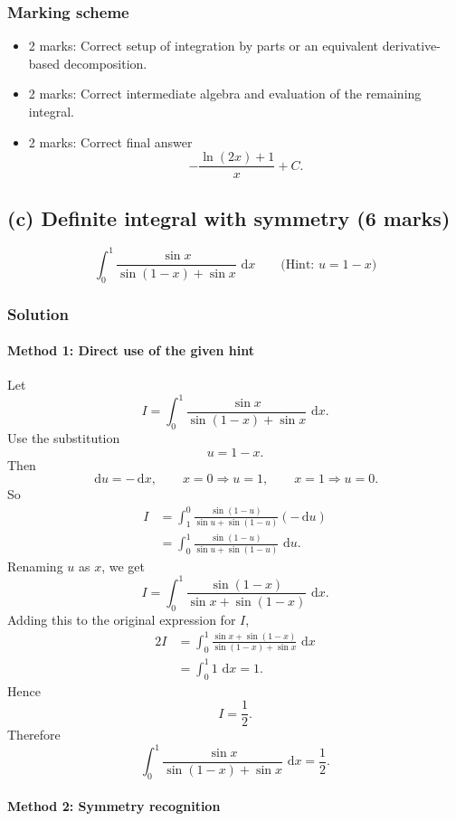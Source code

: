 \documentclass[12pt]{article}
\newcommand{\dd}{\,\mathrm{d}}
\begin{document}
\bigskip
\subsubsection{Marking scheme}
\begin{itemize}
\item 2 marks: Correct setup of integration by parts or an equivalent derivative-based decomposition.
\item 2 marks: Correct intermediate algebra and evaluation of the remaining integral.
\item 2 marks: Correct final answer
\[
-\frac{\ln(2x)+1}{x}+C.
\]
\end{itemize}
\bigskip
\subsection{(c) Definite integral with symmetry \hfill (6 marks)}

\[
\int_0^1 \frac{\sin x}{\sin(1-x)+\sin x}\,\dd x
\qquad
\text{(Hint: }u=1-x\text{)}
\]
\bigskip
\subsubsection{Solution}

\paragraph{Method 1: Direct use of the given hint}

Let
\[
I=\int_0^1 \frac{\sin x}{\sin(1-x)+\sin x}\,\dd x.
\]
Use the substitution
\[
u=1-x.
\]
Then
\[
\dd u=-\dd x,
\qquad
x=0\Rightarrow u=1,
\qquad
x=1\Rightarrow u=0.
\]
So
\begin{align*}
I
&=\int_1^0 \frac{\sin(1-u)}{\sin u+\sin(1-u)}(-\dd u) \\
&=\int_0^1 \frac{\sin(1-u)}{\sin u+\sin(1-u)}\,\dd u.
\end{align*}
Renaming \(u\) as \(x\), we get
\[
I=\int_0^1 \frac{\sin(1-x)}{\sin x+\sin(1-x)}\,\dd x.
\]
Adding this to the original expression for \(I\),
\begin{align*}
2I
&=\int_0^1 \frac{\sin x+\sin(1-x)}{\sin(1-x)+\sin x}\,\dd x \\
&=\int_0^1 1\,\dd x=1.
\end{align*}
Hence
\[
I=\frac12.
\]
Therefore
\[
\boxed{
\int_0^1 \frac{\sin x}{\sin(1-x)+\sin x}\,\dd x=\frac12.
}
\]

\paragraph{Method 2: Symmetry recognition}
\end{document}
